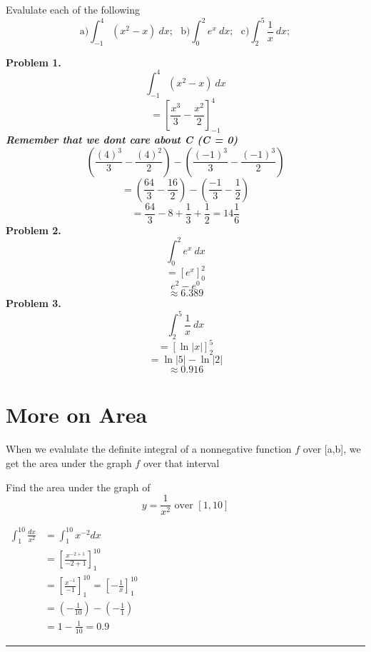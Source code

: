 \documentclass{report}
\begin{document}
\pagebreak \noindent
\begin{mdframed}
\q
Evalulate each of the following
$$ \text{a)} \int_{-1}^4(x^2-x)\ dx; \ \ \ \text{b)} \int_0^2e^x\ dx; \ \ \ \text{c)} \int_2^5\dfrac{1}{x}\ dx;$$
\vspace{1mm}
\end{mdframed}
\bigbreka \noindent
\textbf{Problem 1.}
$$ \int_{-1}^4(x^2-x)\ dx$$
$$ =\left[\dfrac{x^3}{3} -\dfrac{x^2}{2}\right]_{-1}^4$$
\textit{\textbf{Remember that we dont care about C (C = 0)}}
$$ \left(\dfrac{(4)^3}{3} - \dfrac{(4)^2}{2}\right) - \left(\dfrac{(-1)^3}{3} - \dfrac{(-1)^3}{2}\right)$$
$$ = \left(\dfrac{64}{3} - \dfrac{16}{2}\right) - \left(\dfrac{-1}{3} - \dfrac{1}{2}\right)$$
$$ = \dfrac{64}{3} - 8 + \dfrac{1}{3} + \dfrac{1}{2} = 14\dfrac{1}{6}$$
\bigbreak \noindent
\textbf{Problem 2.}
$$ \int_0^2e^x\ dx$$
$$ = \left[e^x\right]_0^2$$
$$ e^2 - e^0$$
$$ \approx 6.389$$
\bigbreak \noindent
\textbf{Problem 3.}
$$ \int_2^5\dfrac{1}{x}\ dx$$
$$ = \left[\ln{\lvert{x}\rvert}\right]_2^5$$
$$ = \ln{\lvert{5}\rvert} - \ln{\lvert{2}\rvert}$$
$$ \approx 0.916$$

\pagebreak
\noindent
\section*{More on Area}
When we evalulate the definite integral of a nonnegative function $f$ over [a,b], we get the area under the graph $f$ over that interval
\begin{mdframed}
\q
Find the area under the graph of
$$ y = \dfrac{1}{x^2} \text{ over } [1,10]$$
\vspace{1mm}
\end{mdframed}
\begin{minipage}{0.5\textwidth}
	\hspace{10mm}$\begin{aligned} \int_1^{10} \frac{d x}{x^2} & =\int_1^{10} x^{-2} d x \\ & =\left[\frac{x^{-2+1}}{-2+1}\right]_1^{10} \\ & =\left[\frac{x^{-1}}{-1}\right]_1^{10}=\left[-\frac{1}{x}\right]_1^{10} \\ & =\left(-\frac{1}{10}\right)-\left(-\frac{1}{1}\right) \\ & =1-\frac{1}{10}=0.9\end{aligned}$
\end{minipage}
\begin{minipage}{0.5\textwidth}
\end{minipage}
\begin{figure}[ht]
    \centering
\end{figure}
\bigbreak \noindent
\hrule
\bigbreak \noindent
\end{document}
